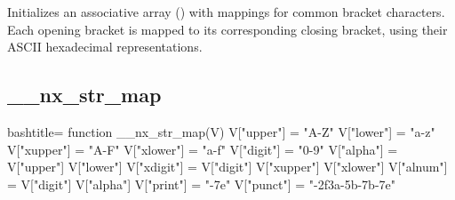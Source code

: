 \begin{NexMainBox}
	\begin{NexMainBox}
		Initializes an associative array () with mappings for common bracket characters. Each opening bracket is mapped to its corresponding closing bracket, using their ASCII hexadecimal representations.
	\end{NexMainBox}
	\begin{NexMainBox}
		\begin{NexListDark}
		\end{NexListDark}
	\end{NexMainBox}
\end{NexMainBox}

\subsection{__nx_str_map}
\label{__nx_str_map}
\begin{NexCodeBox}{bash}{title={}}
function __nx_str_map(V) {
	V["upper"] = "A-Z"
	V["lower"] = "a-z"
	V["xupper"] = "A-F"
	V["xlower"] = "a-f"
	V["digit"] = "0-9"
	V["alpha"] = V["upper"] V["lower"]
	V["xdigit"] = V["digit"] V["xupper"] V["xlower"]
	V["alnum"] = V["digit"] V["alpha"]
	V["print"] = "-\x7e"
	V["punct"] = "-\x2f\x3a-\x5b-\x7b-\x7e"
}
\end{NexCodeBox}

